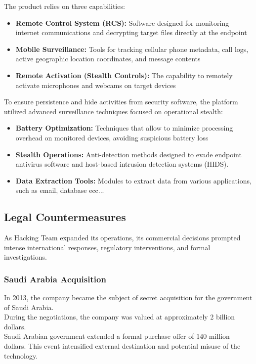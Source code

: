 \noindent
The product relies on three  capabilities:
\begin{itemize}
    \item \textbf{Remote Control System (RCS):} Software designed for monitoring internet communications and decrypting target files directly at the endpoint
    \item \textbf{Mobile Surveillance:} Tools for tracking cellular phone metadata, call logs, active geographic location coordinates, and message contents
    \item \textbf{Remote Activation (Stealth Controls):} The capability to remotely activate microphones and webcams on target devices
\end{itemize}

\noindent
To ensure persistence and hide activities from security software, the platform utilized advanced surveillance techniques focused on operational stealth:
\begin{itemize}
    \item \textbf{Battery Optimization:} Techniques that allow to minimize processing overhead on monitored devices, avoiding suspicious battery loss
    \item \textbf{Stealth Operations:} Anti-detection methods designed to evade endpoint antivirus software and host-based intrusion detection systems (HIDS).
    \item \textbf{Data Extraction Tools:} Modules to extract data from various applications, such as email, database ecc...
\end{itemize}



\subsection{Legal Countermeasures}

As Hacking Team expanded its operations, its commercial decisions prompted intense international responses, regulatory interventions, and formal investigations.

\subsubsection*{Saudi Arabia Acquisition }
In 2013, the company became the subject of secret acquisition for the government of Saudi Arabia.\\
During the negotiations, the company was valued at approximately 2 billion dollars.\\ Saudi Arabian government extended a formal purchase offer of 140 million dollars. This event intensified external destination and potential misuse of the technology.

